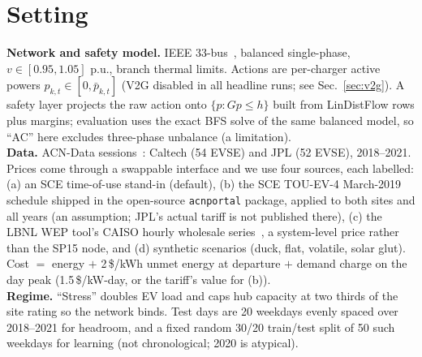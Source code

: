 \documentclass[10pt]{article}
\begin{document}
\section{Setting}
\textbf{Network and safety model.} IEEE 33-bus~\cite{baranwu}, balanced single-phase, $v\in[0.95,1.05]$ p.u., branch thermal limits. Actions are per-charger active powers $p_{k,t}\in[0,\bar p_{k,t}]$ (V2G disabled in all headline runs; see Sec.~\ref{sec:v2g}). A safety layer projects the raw action onto $\{p:Gp\le h\}$ built from LinDistFlow rows plus margins; evaluation uses the exact BFS solve of the same balanced model, so ``AC'' here excludes three-phase unbalance (a limitation).\\
\textbf{Data.} ACN-Data sessions~\cite{acn}: Caltech (54 EVSE) and JPL (52 EVSE), 2018--2021. Prices come through a swappable interface and we use four sources, each labelled: (a) an SCE time-of-use stand-in (default), (b) the SCE TOU-EV-4 March-2019 schedule shipped in the open-source \texttt{acnportal} package, applied to both sites and all years (an assumption; JPL's actual tariff is not published there), (c) the LBNL WEP tool's CAISO hourly wholesale series~\cite{wep}, a system-level price rather than the SP15 node, and (d) synthetic scenarios (duck, flat, volatile, solar glut). Cost $=$ energy $+$ 2\,\$/kWh unmet energy at departure $+$ demand charge on the day peak (1.5\,\$/kW-day, or the tariff's value for (b)).\\
\textbf{Regime.} ``Stress'' doubles EV load and caps hub capacity at two thirds of the site rating so the network binds. Test days are 20 weekdays evenly spaced over 2018--2021 for headroom, and a fixed random 30/20 train/test split of 50 such weekdays for learning (not chronological; 2020 is atypical).
\end{document}
